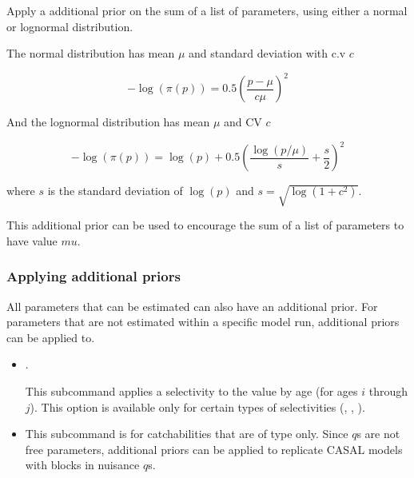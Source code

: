 Apply a  additional prior on the sum of a list of parameters, using either a normal or lognormal distribution.
	
The normal distribution has mean $\mu$ and standard deviation with c.v $c$

\begin{equation}
	- \log \left(\pi \left(p \right) \right) = 0.5\left(\frac{p - \mu}{c\mu} \right)^2
\end{equation}

And the lognormal distribution has mean $\mu$ and CV $c$

\begin{equation}
	- \log \left(\pi \left(p \right) \right) = \log \left( p \right) + 0.5 \left( \frac{\log \left( p / \mu \right)}{s} + \frac{s}{2} \right)^2
\end{equation}
	
where $s$ is the standard deviation of $\log(p)$ and $s= \sqrt{\log \left(1+c^2 \right)}$.

This additional prior can be used to encourage the sum of a list of parameters to have value $mu$.
	
\subsubsection{Applying additional priors}

All parameters that can be estimated can also have an additional prior. For parameters that are not estimated within a specific model run, additional priors can be applied to.

\begin{itemize}
	\item {}.

	This subcommand applies a selectivity to the value by age (for ages $i$ through $j$). This option is available only for certain types of selectivities (, , ). 

	\item {}

	This subcommand is for catchabilities that are of type  only. Since  $q$s are not free parameters, additional priors can be applied to replicate CASAL models with  blocks in nuisance $q$s.
\end{itemize}

